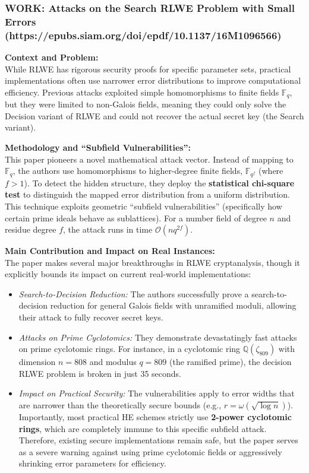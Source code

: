 \subsubsection{WORK: Attacks on the Search RLWE Problem with Small Errors (https://epubs.siam.org/doi/epdf/10.1137/16M1096566)}

\textbf{Context and Problem:} \\
While RLWE has rigorous security proofs for specific parameter sets, practical implementations often use narrower error distributions to improve computational efficiency. Previous attacks exploited simple homomorphisms to finite fields $\mathbb{F}_q$, but they were limited to non-Galois fields, meaning they could only solve the Decision variant of RLWE and could not recover the actual secret key (the Search variant).

\textbf{Methodology and ``Subfield Vulnerabilities'':} \\
This paper pioneers a novel mathematical attack vector. Instead of mapping to $\mathbb{F}_q$, the authors use homomorphisms to higher-degree finite fields, $\mathbb{F}_{q^f}$ (where $f > 1$). To detect the hidden structure, they deploy the \textbf{statistical chi-square test} to distinguish the mapped error distribution from a uniform distribution. This technique exploits geometric ``subfield vulnerabilities'' (specifically how certain prime ideals behave as sublattices). For a number field of degree $n$ and residue degree $f$, the attack runs in time $\mathcal{O}(nq^{2f})$. 

\textbf{Main Contribution and Impact on Real Instances:} \\
The paper makes several major breakthroughs in RLWE cryptanalysis, though it explicitly bounds its impact on current real-world implementations:
\begin{itemize}
    \item \textit{Search-to-Decision Reduction:} The authors successfully prove a search-to-decision reduction for general Galois fields with unramified moduli, allowing their attack to fully recover secret keys.
    \item \textit{Attacks on Prime Cyclotomics:} They demonstrate devastatingly fast attacks on prime cyclotomic rings. For instance, in a cyclotomic ring $\mathbb{Q}(\zeta_{809})$ with dimension $n=808$ and modulus $q=809$ (the ramified prime), the decision RLWE problem is broken in just 35 seconds. 
    \item \textit{Impact on Practical Security:} The vulnerabilities apply to error widths that are narrower than the theoretically secure bounds (e.g., $r = \omega(\sqrt{\log n})$). Importantly, most practical HE schemes strictly use \textbf{2-power cyclotomic rings}, which are completely immune to this specific subfield attack. Therefore, existing secure implementations remain safe, but the paper serves as a severe warning against using prime cyclotomic fields or aggressively shrinking error parameters for efficiency.
\end{itemize}


